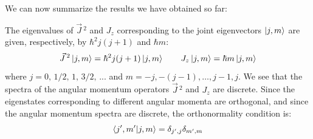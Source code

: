 We can now summarize the results we have obtained so far:
\begin{definition}
    The eigenvalues of $\vec{J}\,^2$ and $J_z$ corresponding to the joint eigenvectors $\ket{j,m}$ are given, respectively, by $\hbar^2j(j+1)$ and $\hbar m$:
    \begin{equation}
        \vec{J}\,^2\ket{j,m} = \hbar^2j(j+1)\ket{j,m}\qquad J_z\ket{j,m} = \hbar m\ket{j,m}
    \end{equation}
    where $j = 0,\, 1/2,\, 1,\, 3/2,\, ...$ and $m = -j, -(j-1), \dots, j-1, j$. We see that the spectra of the angular momentum operators $\vec{J}\,^2$ and $J_z$ are discrete. Since the eigenstates corresponding to different angular momenta are orthogonal, and since the angular momentum spectra are discrete, the orthonormality condition is:
    \begin{equation}
        \braket{j',m'|j,m} = \delta_{j',j}\delta_{m',m}
    \end{equation}
\end{definition}